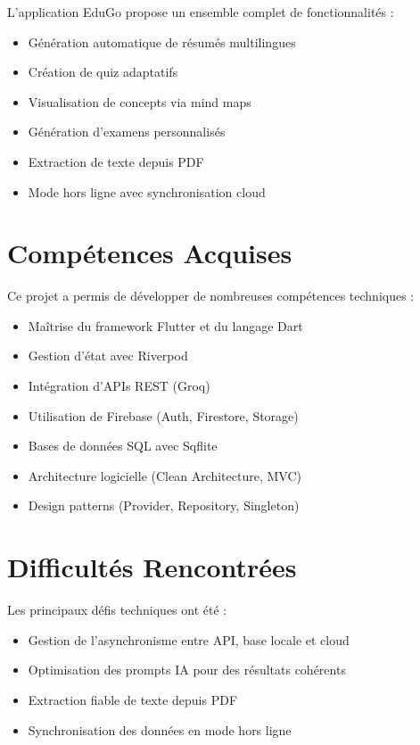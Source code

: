 \documentclass[12pt,a4paper]{report}
\begin{document}
L'application EduGo propose un ensemble complet de fonctionnalités :
\begin{itemize}
    \item Génération automatique de résumés multilingues
    \item Création de quiz adaptatifs
    \item Visualisation de concepts via mind maps
    \item Génération d'examens personnalisés
    \item Extraction de texte depuis PDF
    \item Mode hors ligne avec synchronisation cloud
\end{itemize}

\section*{Compétences Acquises}

Ce projet a permis de développer de nombreuses compétences techniques :
\begin{itemize}
    \item Maîtrise du framework Flutter et du langage Dart
    \item Gestion d'état avec Riverpod
    \item Intégration d'APIs REST (Groq)
    \item Utilisation de Firebase (Auth, Firestore, Storage)
    \item Bases de données SQL avec Sqflite
    \item Architecture logicielle (Clean Architecture, MVC)
    \item Design patterns (Provider, Repository, Singleton)
\end{itemize}

\section*{Difficultés Rencontrées}

Les principaux défis techniques ont été :
\begin{itemize}
    \item Gestion de l'asynchronisme entre API, base locale et cloud
    \item Optimisation des prompts IA pour des résultats cohérents
    \item Extraction fiable de texte depuis PDF
    \item Synchronisation des données en mode hors ligne
\end{itemize}
\end{document}
